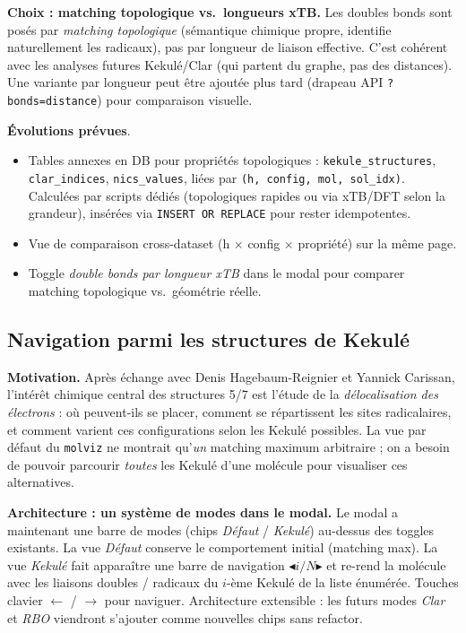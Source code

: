\textbf{Choix : matching topologique vs.~longueurs xTB.} Les doubles bonds sont
posés par \emph{matching topologique} (sémantique chimique propre, identifie
naturellement les radicaux), pas par longueur de liaison effective. C'est cohérent
avec les analyses futures Kekulé/Clar (qui partent du graphe, pas des distances).
Une variante par longueur peut être ajoutée plus tard (drapeau API
\texttt{?bonds=distance}) pour comparaison visuelle.

\textbf{Évolutions prévues}.
\begin{itemize}
  \item Tables annexes en DB pour propriétés topologiques :
    \texttt{kekule\_structures}, \texttt{clar\_indices}, \texttt{nics\_values},
    liées par \texttt{(h, config, mol, sol\_idx)}. Calculées par scripts dédiés
    (topologiques rapides ou via xTB/DFT selon la grandeur), insérées via
    \texttt{INSERT OR REPLACE} pour rester idempotentes.
  \item Vue de comparaison cross-dataset (h $\times$ config $\times$ propriété)
    sur la même page.
  \item Toggle \emph{double bonds par longueur xTB} dans le modal pour comparer
    matching topologique vs.~géométrie réelle.
\end{itemize}

\subsection{Navigation parmi les structures de Kekulé}
\label{sec:molviz-kekule-nav}


\textbf{Motivation.} Après échange avec Denis Hagebaum-Reignier et Yannick
Carissan, l'intérêt chimique central des structures 5/7 est l'étude de la
\emph{délocalisation des électrons} : où peuvent-ils se placer, comment se
répartissent les sites radicalaires, et comment varient ces configurations
selon les Kekulé possibles. La vue par défaut du \texttt{molviz} ne montrait
qu'\emph{un} matching maximum arbitraire ; on a besoin de pouvoir parcourir
\emph{toutes} les Kekulé d'une molécule pour visualiser ces alternatives.

\textbf{Architecture : un système de modes dans le modal.} Le modal a maintenant
une barre de modes (chips \emph{Défaut} / \emph{Kekulé}) au-dessus des toggles
existants. La vue \emph{Défaut} conserve le comportement initial (matching max).
La vue \emph{Kekulé} fait apparaître une barre de navigation
\og{}$\blacktriangleleft$\quad $i / N$\quad $\blacktriangleright$\fg{} et
re-rend la molécule avec les liaisons doubles / radicaux du $i$-ème Kekulé
de la liste énumérée. Touches clavier $\leftarrow$ / $\rightarrow$ pour
naviguer. Architecture extensible : les futurs modes \emph{Clar} et
\emph{RBO} viendront s'ajouter comme nouvelles chips sans refactor.

